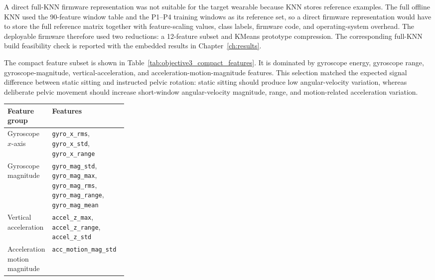 A direct full-KNN firmware representation was not suitable for the target wearable because KNN stores reference examples. The full offline KNN used the 90-feature window table and the P1--P4 training windows as its reference set, so a direct firmware representation would have to store the full reference matrix together with feature-scaling values, class labels, firmware code, and operating-system overhead. The deployable firmware therefore used two reductions: a 12-feature subset and KMeans prototype compression. The corresponding full-KNN build feasibility check is reported with the embedded results in Chapter~\ref{ch:results}.

The compact feature subset is shown in Table~\ref{tab:objective3_compact_features}. It is dominated by gyroscope energy, gyroscope range, gyroscope-magnitude, vertical-acceleration, and acceleration-motion-magnitude features. This selection matched the expected signal difference between static sitting and instructed pelvic rotation: static sitting should produce low angular-velocity variation, whereas deliberate pelvic movement should increase short-window angular-velocity magnitude, range, and motion-related acceleration variation.

\begin{center}
    \small
    \label{tab:objective3_compact_features}
    \begin{tabularx}{\linewidth}{@{}p{0.28\linewidth}X@{}}
        \toprule
        Feature group & Features \\
        \midrule
        Gyroscope \(x\)-axis & \texttt{gyro\_x\_rms}, \texttt{gyro\_x\_std}, \texttt{gyro\_x\_range} \\
        Gyroscope magnitude & \texttt{gyro\_mag\_std}, \texttt{gyro\_mag\_max}, \texttt{gyro\_mag\_rms}, \texttt{gyro\_mag\_range}, \texttt{gyro\_mag\_mean} \\
        Vertical acceleration & \texttt{accel\_z\_max}, \texttt{accel\_z\_range}, \texttt{accel\_z\_std} \\
        Acceleration motion magnitude & \texttt{acc\_motion\_mag\_std} \\
        \bottomrule
    \end{tabularx}
\end{center}

